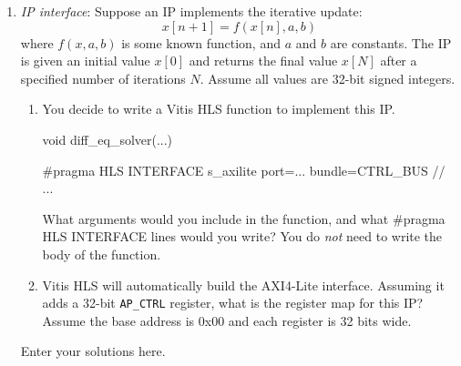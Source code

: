 \documentclass[11pt]{article}
\begin{document}
\begin{enumerate}
Answer the following:

\begin{enumerate}[label=(\alph*)]
  \item On which cycle is the read address transferred?
  \item On which cycle is the read data transferred?
  \item On which cycle may the master de-assert \texttt{ARVALID}?
  \item On which cycle may the slave de-assert \texttt{RVALID}?
  \item On which cycle may the master begin the next read transaction (i.e., assert \texttt{ARVALID} for the next read)?
\end{enumerate}

\begin{solution}
Enter your solutions here.
\end{solution}


\item {}  \emph{IP interface}:  
Suppose an IP implements the iterative update:
\[
    x[n+1] = f(x[n], a, b)
\]
where $f(x,a,b)$ is some known function, and $a$ and $b$ are constants.
The IP is given an initial value $x[0]$ and returns the final value $x[N]$
after a specified number of iterations $N$.
Assume all values are 32-bit signed integers.

\begin{enumerate}[label=(\alph*)]
    \item You decide to write a Vitis HLS function to implement this IP.

\begin{ccode}
void diff_eq_solver(...)

#pragma HLS INTERFACE s_axilite port=... bundle=CTRL_BUS
// ...
\end{ccode}

What arguments would you include in the function, and what \#pragma HLS INTERFACE
lines would you write?  You do \emph{not} need to write the body of the function.

    \item Vitis HLS will automatically build the AXI4-Lite interface.
Assuming it adds a 32-bit \texttt{AP\_CTRL} register, what is the register
map for this IP?  Assume the base address is 0x00 and each register is
32 bits wide.
\end{enumerate}

\begin{solution}
Enter your solutions here.
\end{solution}


\end{enumerate}


  
\end{document}
